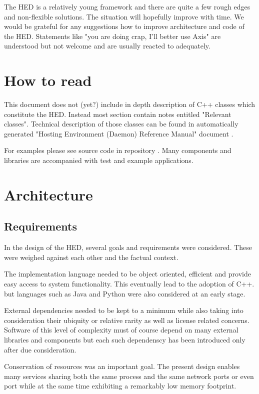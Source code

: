 \documentclass{book}
\begin{document}
The HED is a relatively young framework and there are quite a few rough edges and non-flexible solutions. The situation will hopefully improve with time. We would be grateful for any suggestions how to improve architecture and code of the HED. Statements like "you are doing crap, I'll better use Axis" are understood but not welcome and are usually reacted to adequately.

\chapter{How to read}

This document does not (yet?) include in depth description of C++ classes which constitute the HED. Instead most section contain notes entitled "Relevant classes". Technical description of those classes can be found in automatically generated "Hosting Environment (Daemon) Reference Manual" document \cite{hed-api}.

For examples please see source code in repository \cite{svn-arc1}. Many components and libraries are accompanied with test and example applications.


\chapter{Architecture}

\section{Requirements}
In the design of the HED, several goals and requirements were considered. These were weighed against each other and the factual context.

The implementation language needed to be object oriented, efficient and provide easy access to system functionality. This eventually lead to the adoption of C++. but languages such as Java and Python were also considered at an early stage.

External dependencies needed to be kept to a minimum while also taking into consideration their ubiquity or relative rarity as well as license related concerns. Software of this level of complexity must of course depend on many external libraries and components but each such dependenscy has been introduced only after due consideration.

Conservation of resources was an important goal. The present design enables many services sharing both the same process and the same network ports or even port while at the same time exhibiting a remarkably low memory footprint.
\end{document}
